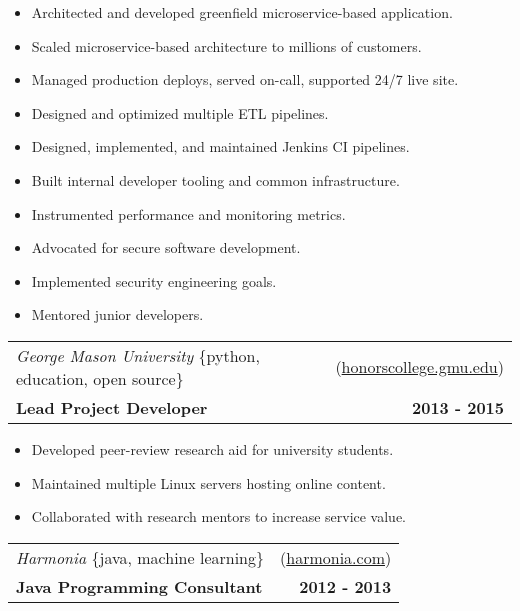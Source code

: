 \documentclass[10pt,letterpaper]{article}
\newenvironment{details}
{\begin{itemize}}
{\end{itemize}}
\begin{document}
\begin{details}
\item Architected and developed greenfield microservice-based application.
\item Scaled microservice-based architecture to millions of customers.
\item Managed production deploys, served on-call, supported 24/7 live site.
\item Designed and optimized multiple ETL pipelines.
\item Designed, implemented, and maintained Jenkins CI pipelines.
\item Built internal developer tooling and common infrastructure.
\item Instrumented performance and monitoring metrics.
\item Advocated for secure software development.
\item Implemented security engineering goals.
\item Mentored junior developers.
\end{details}

\vspace{0.25cm}

\noindent\begin{tabularx}{\textwidth}{@{}X r@{}}
  \textit{George Mason University} \{python, education, open source\} & (\href{https://honorscollege.gmu.edu/collegeresearch}{honorscollege.gmu.edu}) \\
  \textbf{Lead Project Developer} & \textbf{2013 - 2015}
\end{tabularx}

\begin{details}
\item Developed peer-review research aid for university students.
\item Maintained multiple Linux servers hosting online content.
\item Collaborated with research mentors to increase service value.
\end{details}

\vspace{0.25cm}

\noindent\begin{tabularx}{\textwidth}{@{}X r@{}}
  \textit{Harmonia} \{java, machine learning\} & (\href{https://harmonia.com}{harmonia.com}) \\
  \textbf{Java Programming Consultant} & \textbf{2012 - 2013}
\end{tabularx}
\end{document}
